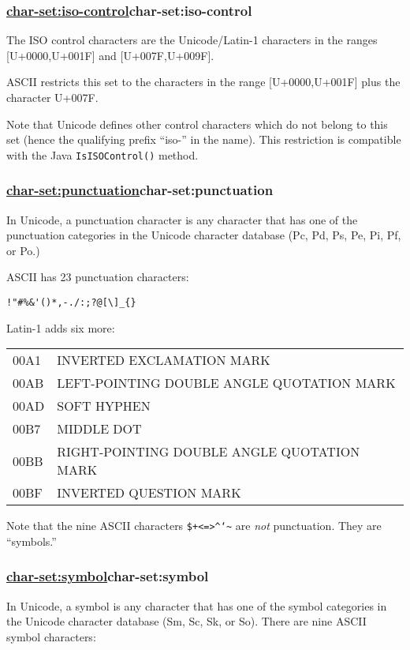 \subsubsection{{\href{}{char-set:iso-control}}{char-set:iso-control}}\label{char-setiso-control}

The ISO control characters are the Unicode/Latin-1 characters in the
ranges {[}U+0000,U+001F{]} and {[}U+007F,U+009F{]}.

ASCII restricts this set to the characters in the range
{[}U+0000,U+001F{]} plus the character U+007F.

Note that Unicode defines other control characters which do not belong
to this set (hence the qualifying prefix ``iso-'' in the name). This
restriction is compatible with the Java \texttt{IsISOControl()} method.

\subsubsection{{\href{}{char-set:punctuation}}{char-set:punctuation}}\label{char-setpunctuation}

In Unicode, a punctuation character is any character that has one of the
punctuation categories in the Unicode character database (Pc, Pd, Ps,
Pe, Pi, Pf, or Po.)

ASCII has 23 punctuation characters:

\begin{verbatim}
!"#%&'()*,-./:;?@[\]_{}
\end{verbatim}

Latin-1 adds six more:

\begin{tabular}{ll}
00A1 & INVERTED EXCLAMATION MARK\tabularnewline
00AB & LEFT-POINTING DOUBLE ANGLE QUOTATION MARK\tabularnewline
00AD & SOFT HYPHEN\tabularnewline
00B7 & MIDDLE DOT\tabularnewline
00BB & RIGHT-POINTING DOUBLE ANGLE QUOTATION MARK\tabularnewline
00BF & INVERTED QUESTION MARK\tabularnewline
\end{tabular}

Note that the nine ASCII characters
\texttt{\$+<=\textgreater{}\^{}`\textbar{}\textasciitilde{}}
are \emph{not} punctuation. They are ``symbols.''

\subsubsection{{\href{}{char-set:symbol}}{char-set:symbol}}\label{char-setsymbol}

In Unicode, a symbol is any character that has one of the symbol
categories in the Unicode character database (Sm, Sc, Sk, or So). There
are nine ASCII symbol characters:

